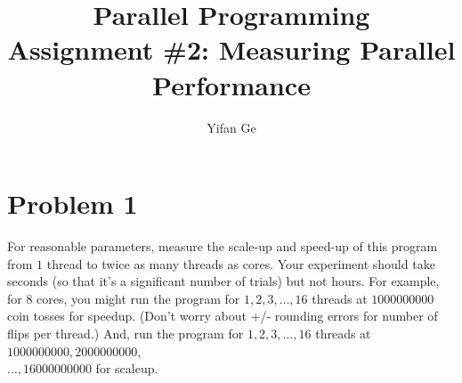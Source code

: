 \documentclass[letterpaper, 11pt]{article}
\begin{document}
\title{Parallel Programming \\ Assignment \#2: Measuring Parallel Performance}
\author{Yifan Ge}


\maketitle


\section*{Problem 1}
For reasonable parameters, measure the scale-up and speed-up of this program from $1$ thread to twice as many threads as cores. Your experiment should take seconds (so that it's a significant number of trials) but not hours. For example, for $8$ cores, you might run the program for $1,2,3,\dots,16$ threads at $1000000000$ coin tosses for speedup. (Don't worry about +/- rounding errors for number of flips per thread.) And, run the program for $1,2,3,\dots, 16$ threads at
$1000000000,2000000000,$\\$\dots,16000000000$ for scaleup. \\
\end{document}
